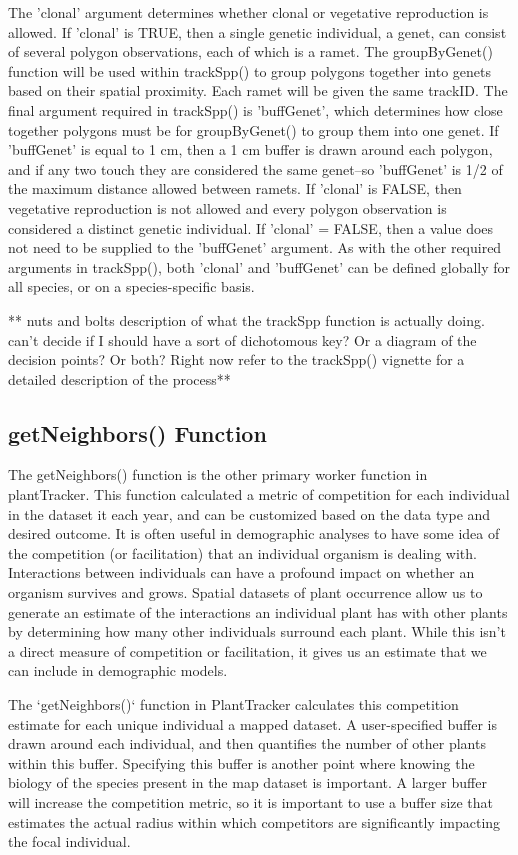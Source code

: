 \documentclass[12pt, letterpaper]{article}
\begin{document}
The 'clonal' argument determines whether clonal or vegetative reproduction is allowed. If 'clonal' is TRUE, then a single genetic individual, a genet, can consist of several polygon observations, each of which is a ramet. The groupByGenet() function will be used within trackSpp() to group polygons together into genets based on their spatial proximity. Each ramet will be given the same trackID. The final argument required in trackSpp() is 'buffGenet', which determines how close together polygons must be for groupByGenet() to group them into one genet. If 'buffGenet' is equal to 1 cm, then a 1 cm buffer is drawn around each polygon, and if any two touch they are considered the same genet--so 'buffGenet' is 1/2 of the maximum distance allowed between ramets. If 'clonal' is FALSE, then vegetative reproduction is not allowed and every polygon observation is considered a distinct genetic individual. If 'clonal' = FALSE, then a value does not need to be supplied to the 'buffGenet' argument. As with the other required arguments in trackSpp(), both 'clonal' and 'buffGenet' can be defined globally for all species, or on a species-specific basis.  

** nuts and bolts description of what the trackSpp function is actually doing. can't decide if I should have a sort of dichotomous key? Or a diagram of the decision points? Or both? Right now refer to the trackSpp() vignette for a detailed description of the process** 

\subsection{getNeighbors() Function}
The getNeighbors() function is the other primary worker function in plantTracker. This function calculated a metric of competition for each individual in the dataset it each year, and can be customized based on the data type and desired outcome. It is often useful in demographic analyses to have some idea of the competition (or facilitation) that an individual organism is dealing with. Interactions between individuals can have a profound impact on whether an organism survives and grows. Spatial datasets of plant occurrence allow us to generate an estimate of the interactions an individual plant has with other plants by determining how many other individuals surround each plant. While this isn't a direct measure of competition or facilitation, it gives us an estimate that we can include in demographic models.

The `getNeighbors()` function in PlantTracker calculates this competition 
estimate for each unique individual a mapped dataset. A user-specified buffer is drawn around each individual, and then quantifies the number of other 
plants within this buffer. Specifying this buffer is another point where knowing the biology of the species present in the map dataset is important. A larger buffer will increase the competition metric, so it is important to use a buffer size that estimates the actual radius within which competitors are significantly impacting the focal individual. 
\end{document}
